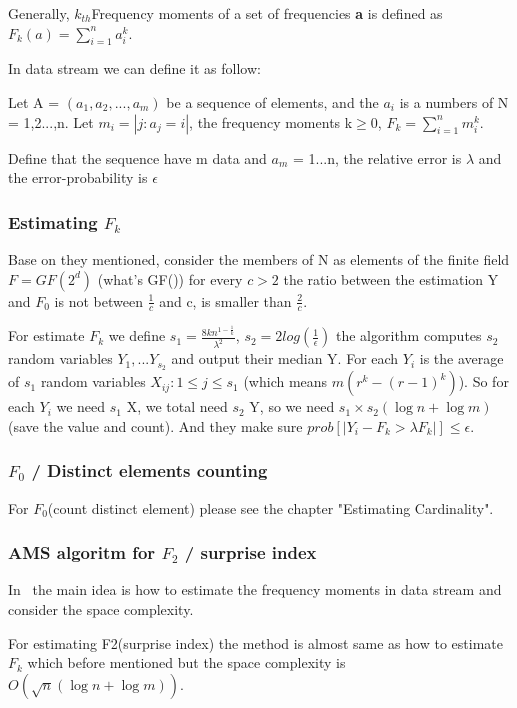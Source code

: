 \documentclass{report}
\begin{document}
Generally, $k_{th}$Frequency moments of a set of frequencies \textbf{a} is defined as $F_k(a) = \sum_{i=1}^n a_i^k $.

In data stream we can define it as follow: 

Let A = $(a_1,a_2,...,a_m)$ be a sequence of elements, and the $a_i$ is a numbers of N = {1,2...,n}. Let $m_i = |{j:a_j = i}|$, the frequency moments k$\geq$0, $F_k = \sum_{i=1}^{n}  m_i^k$.
 
 
Define that the sequence have m data and $a_m$ = {1...n}, the relative error is $\lambda$ and the error-probability is $\epsilon$


\subsubsection{ Estimating $F_k$}
Base on they mentioned, consider the members of N as elements of the finite field $F = GF(2^d)$ (what's GF())
for every $c > 2$ the ratio between the estimation Y and $F_0$ is not between $\frac{1}{c}$ and c, is smaller than $\frac{2}{c}$.


For estimate $F_k$ we define $s_1 = \frac{8kn^{1-\frac{1}{k}}}{\lambda^2}$, $s_2 = 2log(\frac{1}{\epsilon})$
the algorithm computes $s_2$ random variables $Y_1,...Y_{s_2}$ and output their median Y. For each $Y_i$ is the average of $s_1$ random variables $X_{ij} : 1\leq j \leq s_1$ (which means $m(r^k-(r-1)^k)$). So for each $Y_i$ we need $s_1$ X, we total need $s_2$ Y, so we need $s_1 \times s_2 (\log n + \log m)$ (save the value and count). And they make sure $prob[|Y_i - F_k > \lambda F_k|] \leq \epsilon$.

\subsubsection{$F_0$ / Distinct elements counting}

For $F_0$(count distinct element) please see the chapter "Estimating Cardinality".

\subsubsection{ AMS algoritm for $F_2$ / surprise index}


 In~\cite{alon1999space} the main idea is how to estimate the frequency moments in data stream and consider the space complexity.

For estimating F2(surprise index) the method is almost same as how to estimate $F_k$ which before mentioned but the space complexity is $O(\sqrt{n}(\log n + \log m))$.
\end{document}
